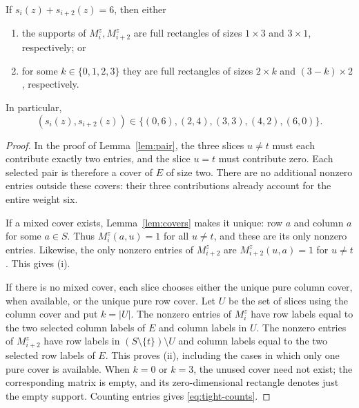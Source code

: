 \begin{lemma}\label{lem:tight}
If $s_i(z)+s_{i+2}(z)=6$, then either
\begin{enumerate}
\item the supports of $M_i^z,M_{i+2}^z$ are full rectangles of sizes
$1\times3$ and $3\times1$, respectively; or
\item for some $k\in\{0,1,2,3\}$ they are full rectangles of sizes
$2\times k$ and $(3-k)\times2$, respectively.
\end{enumerate}
In particular,
\begin{equation}\label{eq:tight-counts}
(s_i(z),s_{i+2}(z))\in\{(0,6),(2,4),(3,3),(4,2),(6,0)\}.
\end{equation}
\end{lemma}
\begin{proof}
In the proof of Lemma~\ref{lem:pair}, the three slices $u\ne t$ must each
contribute exactly two entries, and the slice $u=t$ must contribute zero.
Each selected pair is therefore a cover of $E$ of size two.
There are no additional nonzero entries outside these covers: their
three contributions already account for the entire weight six.

If a mixed cover exists, Lemma~\ref{lem:covers} makes it unique: row $a$
and column $a$ for some $a\in S$. Thus $M_i^z(a,u)=1$ for all $u\ne t$,
and these are its only nonzero entries. Likewise, the only nonzero entries
of $M_{i+2}^z$ are $M_{i+2}^z(u,a)=1$ for $u\ne t$. This gives (i).

If there is no mixed cover, each slice chooses either the unique pure
column cover, when available, or the unique pure row cover. Let $U$ be the
set of slices using the column cover and put $k=|U|$. The nonzero entries
of $M_i^z$ have row labels equal to the two selected column labels of $E$
and column labels in $U$. The nonzero entries of $M_{i+2}^z$ have row
labels in $(S\setminus\{t\})\setminus U$ and column labels equal to the
two selected row labels of $E$. This proves (ii), including the cases in
which only one pure cover is available. When $k=0$ or $k=3$, the
unused cover need not exist; the corresponding matrix is empty, and
its zero-dimensional rectangle denotes just the empty support.
Counting entries gives
\eqref{eq:tight-counts}.
\end{proof}

